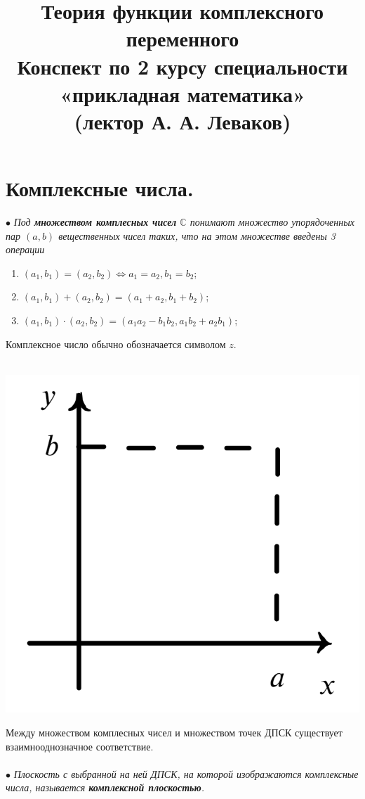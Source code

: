 \documentclass[a4paper, 12pt]{article}
\title{\vspace{6.5cm}\textbf{\Huge{Теория функции комплексного переменного}}\\Конспект по 2 курсу 
	специальности «прикладная математика»\\(лектор А. А. Леваков)}
\date{}
\newcommand{\Cm}{\mathbb{C}}
\begin{document}
	\maketitle
		\newpage
	\tableofcontents{}
	\newpage
	\section{Комплексные числа.}
	$\bullet$ \textit{Под \textbf{множеством комплесных чисел} $\Cm$ понимают множество упорядоченных пар $(a,b)$ вещественных чисел таких, что на этом множестве введены 3 операции}\begin{enumerate}
		\item $(a_1,b_1) = (a_2,b_2) \Longleftrightarrow a_1 = a_2, b_1 = b_2$;
		\item $(a_1,b_1) + (a_2, b_2) = (a_1+a_2, b_1 + b_2)$;
		\item $(a_1, b_1)\cdot (a_2,b_2) = (a_1a_2 - b_1b_2, a_1b_2 + a_2b_1)$;
	\end{enumerate}
Комплексное число обычно обозначается символом $z$.\\\\
\noindent
\parbox[b][3.5cm][t]{10mm}{
	\includegraphics[scale=0.38]{images/001.png}}
\hfill
\parbox[b][2.75cm][t]{115mm}{
Между множеством комплесных чисел и множеством точек ДПСК существует взаимнооднозначное соответствие.\\\\
$\bullet$ \textit{Плоскость с выбранной на ней ДПСК, на которой изображаются комплексные числа, называется \textbf{комплексной плоскостью}.}}\\\\
\end{document}
